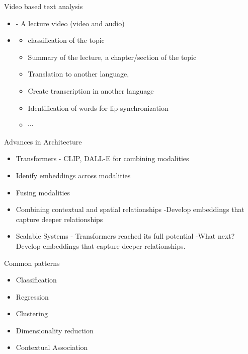 \begin{frame}{Video based text analysis}
    \begin{itemize}
        \item []  -  A lecture video (video and audio)
        \item [] 
        \begin{itemize}
            \item classification of the topic
            \item Summary of the lecture, a chapter/section of the topic
            \item Translation to another language,
            \item Create transcription in another language
            \item Identification of words for lip synchronization
            \item $\cdots$
    \end{itemize}
\end{itemize}
\end{frame}

\begin{frame}{Advances in Architecture}
	\begin{itemize}

		\item Transformers - CLIP, DALL-E for combining modalities
		\item Idenify embeddings across modalities
		\item Fusing modalities
		\item Combining contextual and spatial relationships -Develop embeddings that capture deeper relationships
		\item Scalable Systems - Transformers reached its full potential -What next?
		Develop embeddings that capture deeper relationships.
        \end{itemize}
\end{frame}

\begin{frame}{Common patterns}
	\begin{itemize}
		\item Classification
	 	\item Regression
		\item Clustering
	      	\item Dimensionality reduction
	     	\item Contextual Association
	\end{itemize}
\end{frame}


